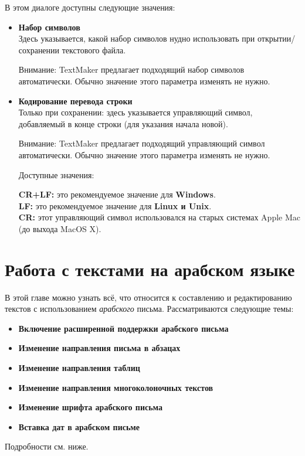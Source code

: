 ﻿\documentclass[a4paper,10pt]{article}
\begin{document}
В этом диалоге доступны следующие значения:
\begin{itemize}
 \item \textbf{Набор символов}\\
 Здесь указывается, какой набор символов нудно использовать при открытии/сохранении текстового файла.
 
 Внимание: TextMaker предлагает подходящий набор символов автоматически. Обычно значение этого параметра изменять не нужно.
 \item \textbf{Кодирование перевода строки}\\
 Только при сохранении: здесь указывается управляющий символ, добавляемый в конце строки (для указания начала новой).
 
 Внимание: TextMaker предлагает подходящий управляющий символ автоматически. Обычно значение этого параметра изменять не нужно.
 
 Доступные значения:
 
 \textbf{CR+LF:} это рекомендуемое значение для \textbf{Windows}.\\
 \textbf{LF:} это рекомендуемое значение для \textbf{Linux и Unix}.\\
 \textbf{CR:} этот управляющий символ использовался на старых системах Apple Mac (до выхода MacOS X).
\end{itemize}

 
 \section{Работа с текстами на арабском языке} \label{sec:работастекстнаараб}
 В этой главе можно узнать всё, что относится к составлению и редактированию текстов с использованием \textit{арабского} письма. Рассматриваются следующие  темы:
 
 \begin{itemize}
  \item \textbf{Включение расширенной поддержки арабского письма}
  \item \textbf{Изменение направления письма в абзацах}
  \item \textbf{Изменение направления таблиц}
  \item \textbf{Изменение направления многоколоночных текстов}
  \item \textbf{Изменение шрифта арабского письма}
  \item \textbf{Вставка дат в арабском письме}
 \end{itemize}

 Подробности см. ниже.
 
\end{document}
